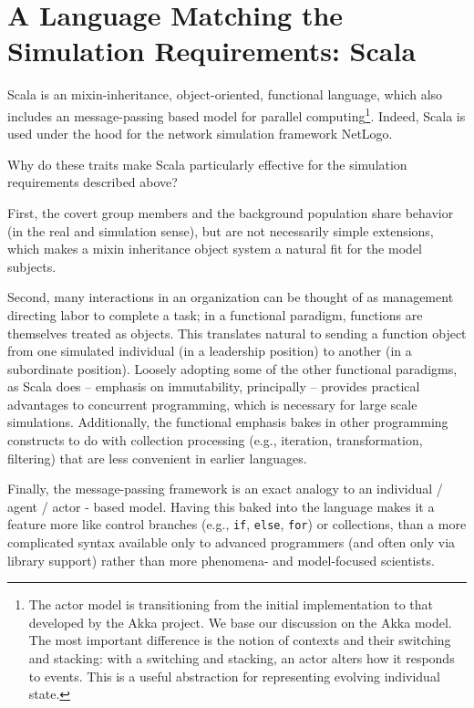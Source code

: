 \documentclass{article}
\begin{document}
\section*{A Language Matching the Simulation Requirements: Scala}
Scala\cite{odersky2004overview} is an mixin-inheritance\cite{bracha1990mixin}, object-oriented, functional language, which also includes an message-passing based model for parallel computing\footnote{The actor model is transitioning from the initial implementation to that developed by the Akka project\cite{akka}.  We base our discussion on the Akka model.  The most important difference is the notion of contexts and their switching and stacking: with a switching and stacking, an actor alters how it responds to events.  This is a useful abstraction for representing evolving individual state.}.  Indeed, Scala is used under the hood for the network simulation framework NetLogo.

Why do these traits make Scala particularly effective for the simulation requirements described above?  

First, the covert group members and the background population share behavior (in the real and simulation sense), but are not necessarily simple extensions, which makes a mixin inheritance object system a natural fit for the model subjects.

Second, many interactions in an organization can be thought of as management directing labor to complete a task; in a functional paradigm, functions are themselves treated as objects.  This translates natural to sending a function object from one simulated individual (in a leadership position) to another (in a subordinate position).  Loosely adopting some of the other functional paradigms, as Scala does -- emphasis on immutability, principally -- provides practical advantages to concurrent programming, which is necessary for large scale simulations.  Additionally, the functional emphasis bakes in other programming constructs to do with collection processing (e.g., iteration, transformation, filtering) that are less convenient in earlier languages.

Finally, the message-passing framework is an exact analogy to an individual / agent / actor - based model.  Having this baked into the language makes it a feature more like control branches (e.g., \texttt{if}, \texttt{else}, \texttt{for}) or collections, than a more complicated syntax available only to advanced programmers (and often only via library support) rather than more phenomena- and model-focused scientists.
\end{document}
